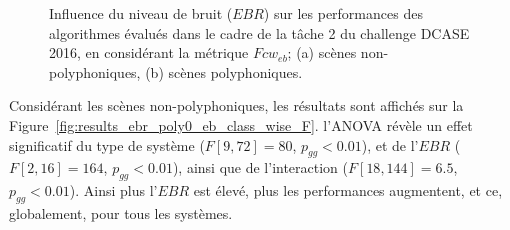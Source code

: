 \begin{figure}[t]
        \myfloatalign
        \par
        \par
       \caption[Influence du niveau de bruit ($EBR$) sur les performances des algorithmes évalués dans le cadre de la tâche 2 du challenge DCASE 2016, en considérant la métrique $Fcw_{eb}$.]{Influence du niveau de bruit ($EBR$) sur les performances des algorithmes évalués dans le cadre de la tâche 2 du challenge DCASE 2016, en considérant la métrique $Fcw_{eb}$; (a) scènes non-polyphoniques, (b) scènes polyphoniques.}\label{fig:dcase2016_poly1_eb_fc}
\end{figure}

Considérant les scènes non-polyphoniques, les résultats sont affichés sur la Figure~\ref{fig:results_ebr_poly0_eb_class_wise_F}. l'ANOVA révèle un effet significatif du type de système ($F[9,72]=80$, $p_{gg}<0.01$), et de l'$EBR$ ($F[2,16]=164$, $p_{gg}<0.01$), ainsi que de l'interaction ($F[18,144]=6.5$, $p_{gg}<0.01$). Ainsi plus l'$EBR$ est élevé, plus les performances augmentent, et ce, globalement, pour tous les systèmes.

